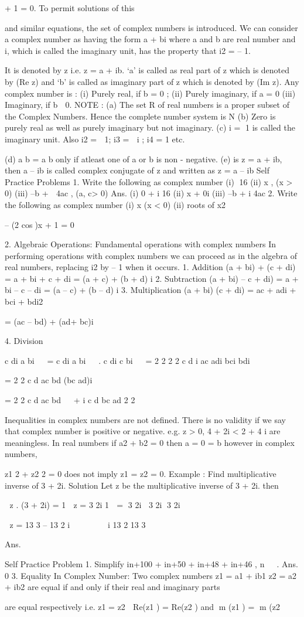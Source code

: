 \documentclass[a4paper,10.5pt,fleqn]{article}
\begin{document}
+ 1 = 0. To permit solutions of this

and similar equations, the set of complex numbers is introduced.
We can consider a complex number as having the form a + bi where a and b are real number and i,
which is called the imaginary unit, has the property that i2
= – 1.

It is denoted by z i.e. z = a + ib. ‘a’ is called as real part of z which is denoted by (Re z) and ‘b’ is called
as imaginary part of z which is denoted by (Im z).
Any complex number is :
(i) Purely real, if b = 0 ; (ii) Purely imaginary, if a = 0
(iii) Imaginary, if b  0.
NOTE : (a) The set R of real numbers is a proper subset of the Complex Numbers. Hence the complete
number system is N
(b) Zero is purely real as well as purely imaginary but not imaginary.
(c) i = 1 is called the imaginary unit.
Also i2 =  1; i3
=  i ; i4
= 1 etc.

(d) a b = a b only if atleast one of a or b is non - negative.
(e) is z = a + ib, then a – ib is called complex conjugate of z and written as z = a – ib
Self Practice Problems
1. Write the following as complex number
(i) 16 (ii) x , (x > 0)
(iii) –b +  4ac , (a, c> 0)
Ans. (i) 0 + i 16 (ii) x + 0i (iii) –b + i 4ac
2. Write the following as complex number
(i) x (x < 0) (ii) roots of x2

– (2 cos)x + 1 = 0

2. Algebraic Operations:
Fundamental operations with complex numbers
In performing operations with complex numbers we can proceed as in the algebra of real numbers,
replacing i2 by – 1 when it occurs.
1. Addition (a + bi) + (c + di) = a + bi + c + di = (a + c) + (b + d) i
2. Subtraction (a + bi) – c + di) = a + bi – c – di = (a – c) + (b – d) i
3. Multiplication (a + bi) (c + di) = ac + adi + bci + bdi2

= (ac – bd) + (ad+ bc)i

4. Division

c di
a bi


=
c di
a bi


.
c di
c bi


= 2 2 2
2
c d i
ac adi bci bdi

  

= 2 2
c d
ac bd (bc ad)i

  

= 2 2
c d
ac bd


+ i
c d
bc ad
2 2



Inequalities in complex numbers are not defined. There is no validity if we say that complex number is
positive or negative.
e.g. z > 0, 4 + 2i < 2 + 4 i are meaningless.
In real numbers if a2
+ b2
= 0 then a = 0 = b however in complex numbers,

z1
2
+ z2
2
= 0 does not imply z1
= z2
= 0.
Example : Find multiplicative inverse of 3 + 2i.
Solution Let z be the multiplicative inverse of 3 + 2i. then

 z . (3 + 2i) = 1
 z = 3 2i
1

= 3 2i 3 2i
3 2i
 


 z = 13
3
– 13
2
i






 i
13
2
13
3

Ans.

Self Practice Problem
1. Simplify in+100 + in+50 + in+48 + in+46 , n  .
Ans. 0
3. Equality In Complex Number:
Two complex numbers z1
= a1 + ib1
 z2
= a2 + ib2
are equal if and only if their real and imaginary parts

are equal respectively
i.e. z1
= z2  Re(z1
) = Re(z2
) and m
(z1
) = m
(z2
\end{document}

